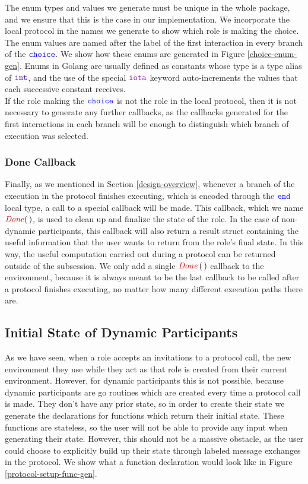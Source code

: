 \documentclass[12pt,twoside]{report}
\begin{document}
The enum types and values we generate must be unique in the whole package, and we ensure that this is the case in our implementation. We incorporate the local protocol in the names we generate to show which role is making the choice. The enum values are named after the label of the first interaction in every branch of the ${\color{blue}\mathtt{choice}}$. We show how these enums are generated in Figure \ref{choice-enum-gen}. Enums in Golang are usually defined as constants whose type is a type alias of $\typename{int}$, and the use of the special $\goiota$ keyword auto-increments the values that each successive constant receives.\\

If the role making the ${\color{blue}\mathtt{choice}}$ is not the role in the local protocol, then it is not necessary to generate any further callbacks, as the callbacks generated for the first interactions in each branch will be enough to distinguish which branch of execution was selected.

\subsubsection{Done Callback}
Finally, as we mentioned in Section \ref{design-overview}, whenever a branch of the execution in the protocol finishes executing, which is encoded through the ${\color{blue}\mathtt{end}}$ local type, a call to a special callback will be made. This callback, which we name $\functionname{Done}(\,)$, is used to clean up and finalize the state of the role. In the case of non-dynamic participants, this callback will also return a result struct containing the useful information that the user wants to return from the role's final state. In this way, the useful computation carried out during a protocol can be returned outside of the subsession. We only add a single $\functionname{Done}\,(\,)$ callback to the environment, because it is always meant to be the last callback to be called after a protocol finishes executing, no matter how many different execution paths there are.

\subsection{Initial State of Dynamic Participants}
As we have seen, when a role accepts an invitations to a protocol call, the new environment they use while they act as that role is created from their current environment. However, for dynamic participants this is not possible, because dynamic participants are go routines which are created every time a protocol call is made. They don't have any prior state, so in order to create their state we generate the declarations for functions which return their initial state. These functions are stateless, so the user will not be able to provide any input when generating their state. However, this should not be a massive obstacle, as the user could choose to explicitly build up their state through labeled message exchanges in the protocol. We show what a function declaration would look like in Figure \ref{protocol-setup-func-gen}.
\\
\end{document}
